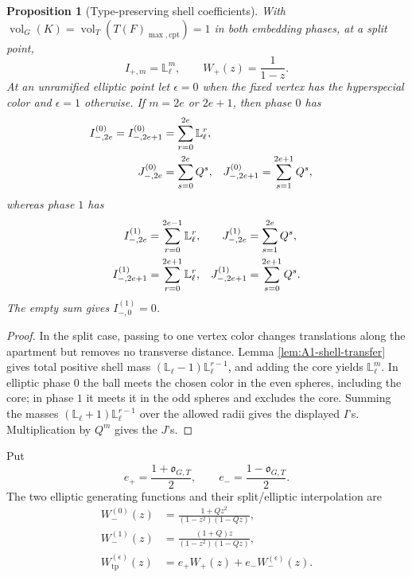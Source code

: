\documentclass[11pt]{article}
\newtheorem{proposition}[theorem]{Proposition}
\theoremstyle{definition}
\theoremstyle{remark}
\newcommand{\Lell}{\mathbb L_{\ell}}
\newcommand{\vol}{\operatorname{vol}}
\begin{document}
\begin{proposition}[Type-preserving shell coefficients]
\label{prop:SL2-parity-coefficients}
With $\vol_G(K)=\vol_T(T(F)_{\max,\mathrm{cpt}})=1$ in both embedding
phases, at a split point,
\begin{equation}
 I_{+,m}=\Lell^m,\qquad W_+(z)=\frac1{1-z}.
 \label{eq:SL2-split-series}
\end{equation}
At an unramified elliptic point let $\epsilon=0$ when the fixed vertex has
the hyperspecial color and $\epsilon=1$ otherwise.  If $m=2e$ or $2e+1$,
then phase $0$ has
\begin{align}
 I_{-,2e}^{(0)}=I_{-,2e+1}^{(0)}
 &=\sum_{r=0}^{2e}\Lell^r,\notag\\
 J_{-,2e}^{(0)}&=\sum_{s=0}^{2e}Q^s,
 &J_{-,2e+1}^{(0)}&=\sum_{s=1}^{2e+1}Q^s,
 \label{eq:SL2-even-phase}
\end{align}
whereas phase $1$ has
\begin{align}
 I_{-,2e}^{(1)}&=\sum_{r=0}^{2e-1}\Lell^r,
 &J_{-,2e}^{(1)}&=\sum_{s=1}^{2e}Q^s,\notag\\
 I_{-,2e+1}^{(1)}&=\sum_{r=0}^{2e+1}\Lell^r,
 &J_{-,2e+1}^{(1)}&=\sum_{s=0}^{2e+1}Q^s.
 \label{eq:SL2-odd-phase}
\end{align}
The empty sum gives $I_{-,0}^{(1)}=0$.
\end{proposition}

\begin{proof}
In the split case, passing to one vertex color changes translations along
the apartment but removes no transverse distance.  Lemma
\ref{lem:A1-shell-transfer} gives total positive shell mass
$(\Lell-1)\Lell^{r-1}$, and adding the core yields $\Lell^m$.
In elliptic phase $0$ the ball meets the chosen color in the even spheres,
including the core; in phase $1$ it meets it in the odd spheres and excludes
the core.  Summing the masses
$(\Lell+1)\Lell^{r-1}$ over the allowed radii gives the displayed $I$'s.
Multiplication by $Q^m$ gives the $J$'s.
\end{proof}

Put
\[
 e_+=\frac{1+\mathfrak o_{G,T}}2,
 \qquad e_-=\frac{1-\mathfrak o_{G,T}}2.
\]
The two elliptic generating functions and their split/elliptic interpolation
are
\begin{align}
 W_-^{(0)}(z)&=\frac{1+Qz^2}{(1-z^2)(1-Qz)},
 \label{eq:SL2-even-series}\\
 W_-^{(1)}(z)&=\frac{(1+Q)z}{(1-z^2)(1-Qz)},
 \label{eq:SL2-odd-series}\\
 W_{\mathrm{tp}}^{(\epsilon)}(z)
 &=e_+W_+(z)+e_-W_-^{(\epsilon)}(z).
 \label{eq:SL2-type-preserving-series}
\end{align}
\end{document}
